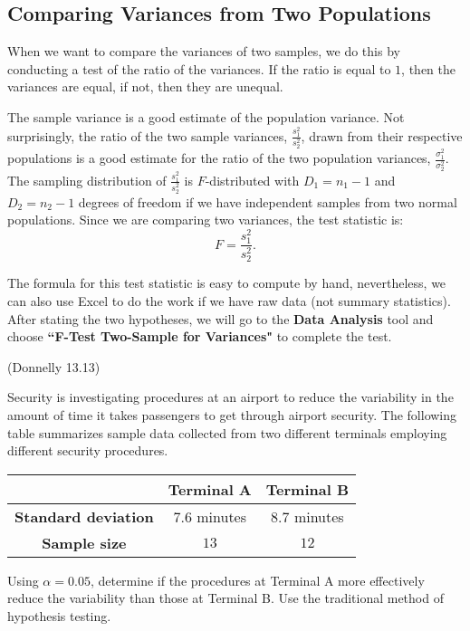 \documentclass[12pt, letterpaper]{article}
\newcommand{\ds}{\displaystyle}
\newcounter{exercise}
\theoremstyle{definition}
\begin{document}
\begin{statement}
\section*{Comparing Variances from Two Populations}

\noindent When we want to compare the variances of two samples, we do this by conducting a test of the ratio of the variances.  If the ratio is equal to $1$, then the variances are equal, if not, then they are unequal.

\vspace*{.1in}

\noindent The sample variance is a good estimate of the population variance.  Not surprisingly, the ratio of the two sample variances, $\ds\frac{s_1^2}{s_2^2}$, drawn from their respective populations is a good estimate for the ratio of the two population variances, $\ds\frac{\sigma_1^2}{\sigma_2^2}$.  The sampling distribution of $\ds\frac{s_1^2}{s_2^2}$ is $F$-distributed with $D_1 = n_1 -1$ and $D_2 = n_2 -1$ degrees of freedom if we have independent samples from two normal populations.  Since we are comparing two variances, the test statistic is:
$$ F = \frac{s_1^2}{s_2^2}. $$

\noindent The formula for this test statistic is easy to compute by hand, nevertheless, we can also use Excel to do the work if we have raw data (not summary statistics).  After stating the two hypotheses, we will go to the \textbf{Data Analysis} tool and choose \textbf{``F-Test Two-Sample for Variances"} to complete the test.

\end{statement}

\begin{exercise}  (Donnelly 13.13)

Security is investigating procedures at an airport to reduce the variability in the amount of time it takes passengers to get through airport security.  The following table summarizes sample data collected from two different terminals employing different security procedures.

\begin{center}
\begin{tabular}{c|c|c}

 & \textbf{Terminal A} & \textbf{Terminal B}\\ \hline
 
 \textbf{Standard deviation} & $7.6$ minutes & $8.7$ minutes \\ \hline
 
 \textbf{Sample size} & $13$ & $12$ \\ \hline

\end{tabular}
\end{center}

Using $\alpha = 0.05$, determine if the procedures at Terminal A more effectively reduce the variability than those at Terminal B.  Use the traditional method of hypothesis testing.

\end{exercise}
\end{document}

